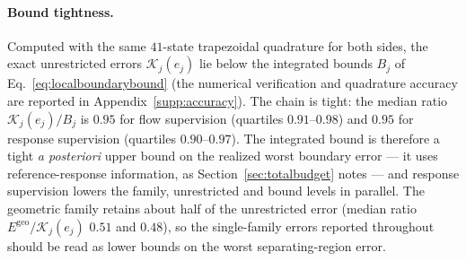 \paragraph{Bound tightness.}
Computed with the same $41$-state trapezoidal quadrature for both
sides, the exact unrestricted errors $\mathcal K_j(e_j)$ lie below the
integrated bounds $B_j$ of Eq.~\eqref{eq:localboundarybound} (the
numerical verification and quadrature accuracy are reported in
Appendix~\ref{supp:accuracy}). The chain is tight: the median ratio
$\mathcal K_j(e_j)/B_j$ is $0.95$ for flow supervision (quartiles
$0.91$--$0.98$) and $0.95$ for response supervision (quartiles
$0.90$--$0.97$). The integrated bound is therefore a tight
\emph{a posteriori} upper bound on the realized worst boundary error
--- it uses reference-response information, as
Section~\ref{sec:totalbudget} notes --- and response supervision lowers
the family, unrestricted and bound levels in parallel. The geometric
family retains about half of the unrestricted error (median ratio
$E^{\mathrm{geo}}/\mathcal K_j(e_j)$ $0.51$ and $0.48$), so the
single-family errors reported throughout should be read as lower
bounds on the worst separating-region error.
